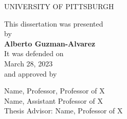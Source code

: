 \setcounter{page}{2}

\pagestyle{plain}

\begin{center}
UNIVERSITY OF PITTSBURGH\\
\end{center}

       \vspace*{8\baselineskip}


\begin{center}
This dissertation was presented\\
by\\
       \vspace*{1\baselineskip}
\textbf{Alberto Guzman-Alvarez}\\
       \vspace*{1\baselineskip}
It was defended on\\
March 28, 2023\\
and approved by
\end{center}

\begin{center}
Name, Professor, Professor of X\\
Name, Assistant Professor of X\\
Thesis Advisor: Name, Professor of X\\
\end{center}

\newpage
